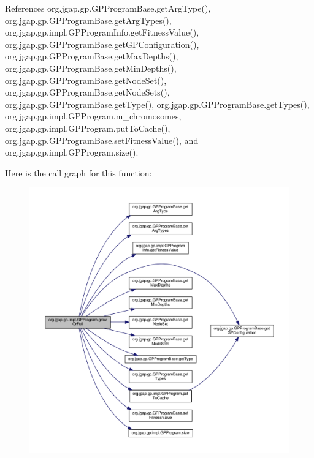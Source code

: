 References org.\-jgap.\-gp.\-G\-P\-Program\-Base.\-get\-Arg\-Type(), org.\-jgap.\-gp.\-G\-P\-Program\-Base.\-get\-Arg\-Types(), org.\-jgap.\-gp.\-impl.\-G\-P\-Program\-Info.\-get\-Fitness\-Value(), org.\-jgap.\-gp.\-G\-P\-Program\-Base.\-get\-G\-P\-Configuration(), org.\-jgap.\-gp.\-G\-P\-Program\-Base.\-get\-Max\-Depths(), org.\-jgap.\-gp.\-G\-P\-Program\-Base.\-get\-Min\-Depths(), org.\-jgap.\-gp.\-G\-P\-Program\-Base.\-get\-Node\-Set(), org.\-jgap.\-gp.\-G\-P\-Program\-Base.\-get\-Node\-Sets(), org.\-jgap.\-gp.\-G\-P\-Program\-Base.\-get\-Type(), org.\-jgap.\-gp.\-G\-P\-Program\-Base.\-get\-Types(), org.\-jgap.\-gp.\-impl.\-G\-P\-Program.\-m\-\_\-chromosomes, org.\-jgap.\-gp.\-impl.\-G\-P\-Program.\-put\-To\-Cache(), org.\-jgap.\-gp.\-G\-P\-Program\-Base.\-set\-Fitness\-Value(), and org.\-jgap.\-gp.\-impl.\-G\-P\-Program.\-size().



Here is the call graph for this function\-:
\nopagebreak
\begin{figure}[H]
\begin{center}
\leavevmode
\includegraphics[width=350pt]{classorg_1_1jgap_1_1gp_1_1impl_1_1_g_p_program_afa3deae00dc713972f745187b993c5f0_cgraph}
\end{center}
\end{figure}


